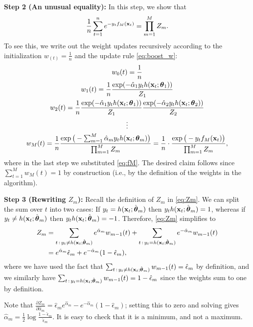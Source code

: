 \documentclass[english]{article}
\begin{document}
\medskip
{\noindent \bf Step 2 (An unusual equality):} In this step, we show that
    \begin{equation}
        \frac{1}{n}\sum_{t=1}^n e^{-y_t f_M(\mathbf{x}_t)} = \prod_{m=1}^M Z_m. \label{eq:step2a}
    \end{equation}  
To see this, we write out the weight updates recursively according to the initialization $w_(t) = \frac{1}{n}$ and the update rule \eqref{eq:boost_w}:
    \begin{gather*}
        w_0(t) = \frac{1}{n} \\
        w_1(t) = \frac{1}{n} \frac{ \exp(-\hat{\alpha}_1 y_t h(\mathbf{x}_t; \boldsymbol{\theta}_1 )) }{Z_1} \\
        w_2(t) = \frac{1}{n} \frac{ \exp(-\hat{\alpha}_1 y_t h(\mathbf{x}_t; \boldsymbol{\theta}_1 )) }{Z_1} \frac{ \exp(-\hat{\alpha}_2 y_t h(\mathbf{x}_t; \boldsymbol{\theta}_2 )) }{Z_2} \\
        \vdots \\
        w_M(t) = \frac{1}{n}  \frac{\exp\big( -\sum_{m=1}^M \hat{\alpha}_m y_t h(\mathbf{x}_t;\boldsymbol{\theta}_m) \big)}{ \prod_{m=1}^M Z_m } = \frac{1}{n} \cdot \frac{\exp\big( -y_t f_M(\mathbf{x}_t) \big)}{ \prod_{m=1}^M Z_m },
    \end{gather*}
    where in the last step we substituted \eqref{eq:fM}.
    The desired claim follows since $\sum_{t=1}^M w_M(t) = 1$ by construction (i.e., by the definition of the weights in the algorithm).

\medskip
{\noindent \bf Step 3 (Rewriting $Z_m$):} Recall the definition of $Z_m$ in \eqref{eq:Zm}.  We can split the sum over $t$ into two cases: If $y_t = h(\mathbf{x}_t;\hat{\boldsymbol{\theta}}_m)$ then $y_t h(\mathbf{x}_t;\hat{\boldsymbol{\theta}}_m) = 1$, whereas if $y_t \ne h(\mathbf{x}_t;\hat{\boldsymbol{\theta}}_m)$ then $y_t h(\mathbf{x}_t;\hat{\boldsymbol{\theta}}_m) = -1$.  Therefore, \eqref{eq:Zm} simplifies to
\begin{align}
    Z_m &= \sum_{t\,:\,y_t \ne h(\mathbf{x}_t;\hat{\boldsymbol{\theta}}_m)} e^{\hat{\alpha}_m} w_{m-1}(t) + \sum_{t\,:\,y_t = h(\mathbf{x}_t;\hat{\boldsymbol{\theta}}_m)} e^{-\hat{\alpha}_m} w_{m-1}(t) \nonumber \\
        &= e^{\hat{\alpha}_m} \hat{\epsilon}_m + e^{-\hat{\alpha}_m}(1 - \hat{\epsilon}_m), \label{eq:Z_new}
\end{align} 
where we have used the fact that $\sum_{t\,:\,y_t \ne h(\mathbf{x}_t;\hat{\boldsymbol{\theta}}_m)} w_{m-1}(t) = \hat{\epsilon}_m$ by definition, and we similarly have $\sum_{t\,:\,y_t = h(\mathbf{x}_t;\hat{\boldsymbol{\theta}}_m)} w_{m-1}(t) = 1 - \hat{\epsilon}_m$ since the weights sum to one by definition.

Note that $\frac{\partial Z_m}{\partial \hat{\alpha}_m} = \hat{\epsilon}_m e^{\hat{\alpha}_m} - e^{-\hat{\alpha}_m}(1-\hat{\epsilon}_m)$; setting this to zero and solving gives $\hat{\alpha}_m = \frac{1}{2} \log \frac{1 - \hat{\epsilon}_m}{\hat{\epsilon}_m}$. It is easy to check that it is a minimum, and not a maximum.
\end{document}
